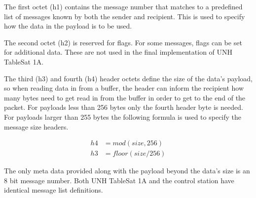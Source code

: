 The first octet (h1) contains the message number that matches to a predefined list of messages known by both the sender and recipient.  This is used to specify how the data in the payload is to be used.

The second octet (h2) is reserved for flags.  For some messages, flags can be set for additional data.  These are not used in the final implementation of UNH TableSat 1A.

The third (h3) and fourth (h4) header octets define the size of the data's payload, so when reading data in from a buffer, the header can inform the recipient how many bytes need to get read in from the buffer in order to get to the end of the packet.  For payloads less than 256 bytes only the fourth header byte is needed.  For payloads larger than 255 bytes the following formula is used to specify the message size headers.

\begin{subequations}
  \begin{align}
    h4 &= mod(size, 256) \\
    h3 &= floor(size / 256)
  \end{align}
  \label{eqn:UDPSizeHeader}
\end{subequations}

The only meta data provided along with the payload beyond the data's size is an 8 bit message number.  Both UNH TableSat 1A and the control station have identical message list definitions.


